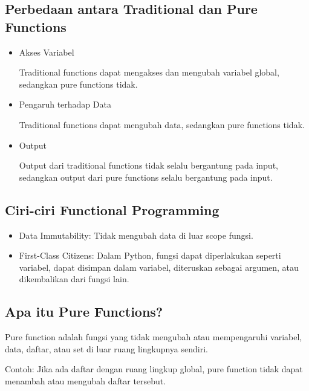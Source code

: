 \documentclass{article}
\begin{document}
\subsection{Perbedaan antara Traditional dan Pure Functions}
\begin{itemize}
    \item Akses Variabel

          Traditional functions dapat mengakses dan mengubah variabel global, sedangkan pure functions tidak.
    \item Pengaruh terhadap Data

          Traditional functions dapat mengubah data, sedangkan pure functions tidak.
    \item Output

          Output dari traditional functions tidak selalu bergantung pada input, sedangkan output dari pure functions selalu bergantung pada input.
\end{itemize}

\subsection{Ciri-ciri Functional Programming}
\begin{itemize}
    \item Data Immutability: Tidak mengubah data di luar scope fungsi.
    \item First-Class Citizens: Dalam Python, fungsi dapat diperlakukan seperti variabel, dapat disimpan dalam variabel, diteruskan sebagai argumen, atau dikembalikan dari fungsi lain.
\end{itemize}

\subsection{Apa itu Pure Functions?}
Pure function adalah fungsi yang tidak mengubah atau mempengaruhi variabel, data, daftar, atau set di luar ruang lingkupnya sendiri.

Contoh: Jika ada daftar dengan ruang lingkup global, pure function tidak dapat menambah atau mengubah daftar tersebut.
\end{document}
